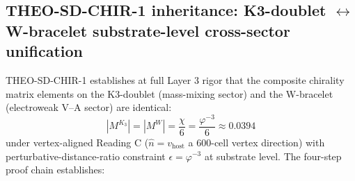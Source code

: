 \documentclass[11pt,letterpaper]{article}
\begin{document}
\subsection{THEO-SD-CHIR-1 inheritance: K3-doublet $\leftrightarrow$ W-bracelet substrate-level cross-sector unification}
\label{sec:theo_sd_chir_1}

THEO-SD-CHIR-1 \cite{ResearchFrontier, Capotauro} establishes at full Layer 3 rigor that the composite chirality matrix elements on the K3-doublet (mass-mixing sector) and the W-bracelet (electroweak V--A sector) are identical:
\begin{equation}
\left| M^{K_3} \right| = \left| M^W \right| = \frac{\chi}{6} = \frac{\varphi^{-3}}{6} \approx 0.0394
\label{eq:k3_w_unification}
\end{equation}
under vertex-aligned Reading C ($\hat{n} = v_{\text{host}}$ a 600-cell vertex direction) with perturbative-distance-ratio constraint $\epsilon = \varphi^{-3}$ at substrate level. The four-step proof chain establishes:
\end{document}
